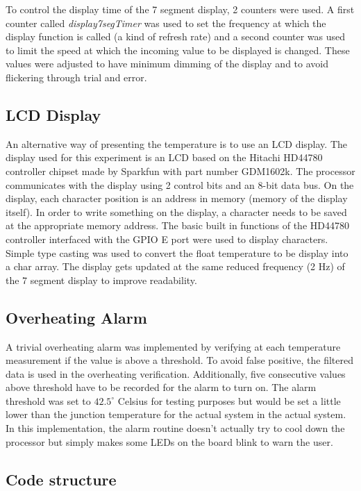 \documentclass[12pt]{article}
\begin{document}
To control the display time of the 7 segment display, 2 counters were used. A first counter called \textit{display7segTimer} was used to set the frequency at which the display function is called (a kind of refresh rate) and a second counter was used to limit the speed at which the incoming value to be displayed is changed. These values were adjusted to have minimum dimming of the display and to avoid flickering through trial and error.

\subsection{LCD Display}
\label{LCD_dis}
An alternative way of presenting the temperature is to use an LCD display. The display used for this experiment is an LCD based on  the  Hitachi  HD44780  controller  chipset made by Sparkfun with part number GDM1602k. The processor communicates with the display using 2 control bits and an 8-bit data bus. On the display, each character position is an address in memory (memory of the display itself). In order to write something on the display, a character needs to be saved at the appropriate memory address. The basic built in functions of the HD44780 controller interfaced with the GPIO E port were used to display characters. Simple type casting was used to convert the float temperature to be display into a char array. The display gets updated at the same reduced frequency (2 Hz) of the 7 segment display to improve readability. 

\subsection{Overheating Alarm}
A trivial overheating alarm was implemented by verifying at each temperature measurement if the value is above a threshold. To avoid false positive, the filtered data is used in the overheating verification. Additionally, five consecutive values above threshold have to be recorded for the alarm to turn on. The alarm threshold was set to $42.5^\circ$ Celsius for testing purposes but would be set a little lower than the junction temperature for the actual system in the actual system. In this implementation, the alarm routine doesn't actually try to cool down the processor but simply makes some LEDs on the board blink to warn the user.

\subsection{Code structure}
\end{document}

